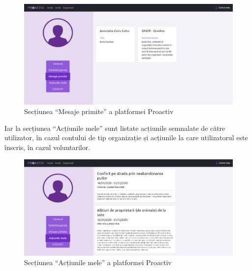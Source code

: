 \documentclass[12pt,a4paper]{report}
\begin{document}
\\
\begin{figure}[H]
\centering
  \includegraphics[width=1\linewidth]{./imagini/cont3.jpg}
  \caption{Secțiunea “Mesaje primite” a platformei Proactiv}
\end{figure}
\par
Iar la secțiunea “Acțiunile mele” sunt listate acțiunile semnalate de către utilizator, în cazul contului de tip organizație și acțiunile la care utilizatorul este înscris, în cazul voluntarilor.
\\
\begin{figure}[H]
\centering
  \includegraphics[width=1\linewidth]{./imagini/cont4.jpg}
  \caption{Secțiunea “Acțiunile mele” a platformei Proactiv}
\end{figure}
\end{document}
